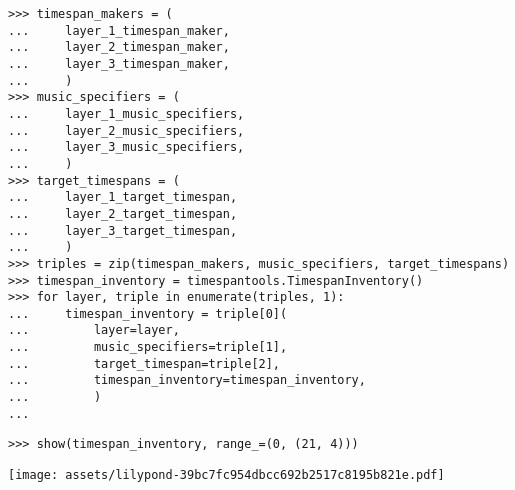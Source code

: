 \begin{comment}
<abjad>
timespan_makers = (
    layer_1_timespan_maker,
    layer_2_timespan_maker,
    layer_3_timespan_maker,
    )
music_specifiers = (
    layer_1_music_specifiers,
    layer_2_music_specifiers,
    layer_3_music_specifiers,
    )
target_timespans = (
    layer_1_target_timespan,
    layer_2_target_timespan,
    layer_3_target_timespan,
    )
triples = zip(timespan_makers, music_specifiers, target_timespans)
timespan_inventory = timespantools.TimespanInventory()
for layer, triple in enumerate(triples, 1):
    timespan_inventory = triple[0](
        layer=layer,
        music_specifiers=triple[1],
        target_timespan=triple[2],
        timespan_inventory=timespan_inventory,
        )

</abjad>
\end{comment}

\begin{abjadbookoutput}
\begin{singlespacing}
\vspace{-0.5\baselineskip}
\begin{lstlisting}
>>> timespan_makers = (
...     layer_1_timespan_maker,
...     layer_2_timespan_maker,
...     layer_3_timespan_maker,
...     )
>>> music_specifiers = (
...     layer_1_music_specifiers,
...     layer_2_music_specifiers,
...     layer_3_music_specifiers,
...     )
>>> target_timespans = (
...     layer_1_target_timespan,
...     layer_2_target_timespan,
...     layer_3_target_timespan,
...     )
>>> triples = zip(timespan_makers, music_specifiers, target_timespans)
>>> timespan_inventory = timespantools.TimespanInventory()
>>> for layer, triple in enumerate(triples, 1):
...     timespan_inventory = triple[0](
...         layer=layer,
...         music_specifiers=triple[1],
...         target_timespan=triple[2],
...         timespan_inventory=timespan_inventory,
...         )
...
\end{lstlisting}
\end{singlespacing}
\end{abjadbookoutput}

\begin{comment}
<abjad>
show(timespan_inventory, range_=(0, (21, 4)))
</abjad>
\end{comment}

\begin{abjadbookoutput}
\begin{singlespacing}
\vspace{-0.5\baselineskip}
\begin{lstlisting}
>>> show(timespan_inventory, range_=(0, (21, 4)))
\end{lstlisting}
\noindent\texttt{[image: assets/lilypond-39bc7fc954dbcc692b2517c8195b821e.pdf]}
\end{singlespacing}
\end{abjadbookoutput}

